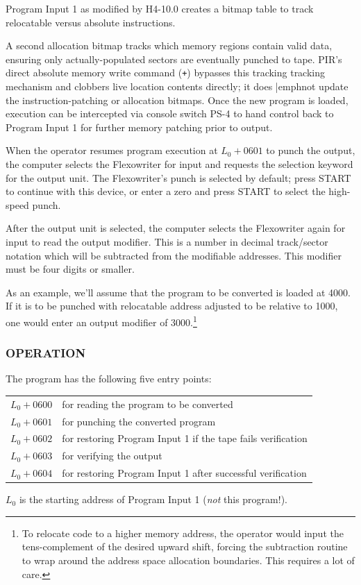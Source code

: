 \noindent Program Input 1 as modified by H4-10.0 creates a bitmap table to track relocatable versus absolute instructions.

A second allocation bitmap tracks which memory regions contain valid data, ensuring only actually-populated sectors are eventually punched to tape. PIR's direct absolute memory write command (\texttt{+}) bypasses this tracking tracking mechanism and clobbers live location contents directly; it does |emph{not} update the instruction-patching or allocation bitmaps. Once the new program is loaded, execution can be intercepted via console switch \textsf{PS-4} to hand control back to Program Input 1 for further memory patching prior to output.

When the operator resumes program execution at $L_0+0601$ to punch the output, the computer selects the Flexowriter for input and requests the selection keyword for the output unit. The Flexowriter's punch is selected by default; press \textsf{START} to continue with this device, or enter a zero and press \textsf{START} to select the high-speed punch.

After the output unit is selected, the computer selects the Flexowriter again for input to read the output modifier. This is a number in decimal track/sector notation which will be subtracted from the modifiable addresses. This modifier must be four digits or smaller.

As an example, we'll assume that the program to be converted is loaded at 4000. If it is to be punched with relocatable address adjusted to be relative to 1000, one would enter an output modifier of 3000.\footnote{To relocate code to a higher memory address, the operator would input the tens-complement of the desired upward shift, forcing the subtraction routine to wrap around the address space allocation boundaries. This requires a lot of care.}

\subsubsection*{OPERATION}
The program has the following five entry points:

\begin{center}
\begin{tabular}{ll}
$L_0+0600$ & for reading the program to be converted \\
$L_0+0601$ & for punching the converted program \\
$L_0+0602$ & for restoring Program Input 1 if the tape fails verification \\
$L_0+0603$ & for verifying the output \\
$L_0+0604$ & for restoring Program Input 1 after successful verification \\
\end{tabular}
\end{center}
$L_0$ is the starting address of Program Input 1 (\emph{not} this program!).

